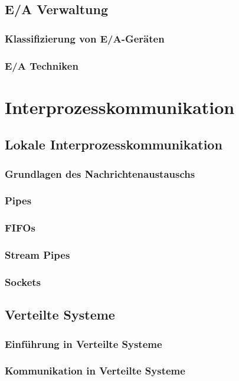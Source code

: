 \documentclass{article}
\begin{document}
\subsection{E/A Verwaltung}
\subsubsection{Klassifizierung von E/A-Geräten}
\subsubsection{E/A Techniken}

\newpage
\section{Interprozesskommunikation}
\subsection{Lokale Interprozesskommunikation}
\subsubsection{Grundlagen des Nachrichtenaustauschs}
\subsubsection{Pipes}
\subsubsection{FIFOs}
\subsubsection{Stream Pipes}
\subsubsection{Sockets}
\subsection{Verteilte Systeme}
\subsubsection{Einführung in Verteilte Systeme}
\subsubsection{Kommunikation in Verteilte Systeme}
\end{document}
